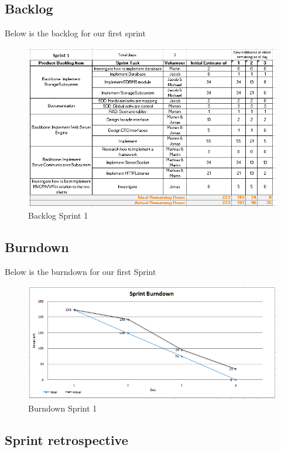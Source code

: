 \subsection{Backlog}
Below is the backlog for our first sprint
\begin{figure}[h]
\includegraphics[scale=0.75]{img/SCRUM/backlogSprint1.png}
\caption{Backlog Sprint 1}
\label{fig:Backlog Sprint 1}
\end{figure}

\newpage
\subsection{Burndown}
Below is the burndown for our first Sprint
\begin{figure}[h]
\includegraphics[scale=0.7]{img/SCRUM/burndownSprint1.png}
\caption{Burndown Sprint 1}
\label{fig:Burndown Sprint 1}
\end{figure}


\subsection{Sprint retrospective}

